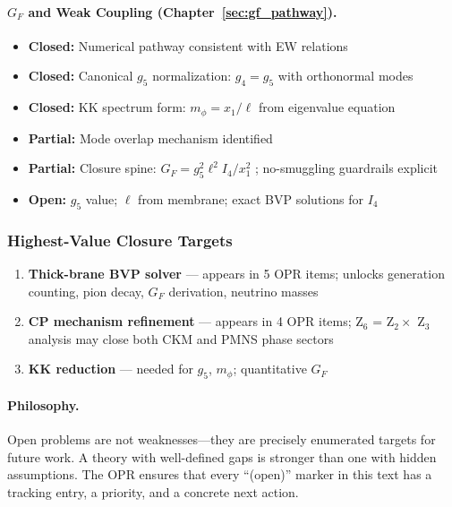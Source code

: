 \paragraph{\texorpdfstring{$G_F$ and Weak Coupling (Chapter~\ref{sec:gf_pathway}).}{GF and Weak Coupling.}}
\begin{itemize}[nosep]
    \item \textcolor{OliveGreen}{\textbf{Closed:}} Numerical pathway consistent with EW relations \tagDc{}
    \item \textcolor{OliveGreen}{\textbf{Closed:}} Canonical $g_5$ normalization: $g_4 = g_5$ with orthonormal modes \tagDc{}
    \item \textcolor{OliveGreen}{\textbf{Closed:}} KK spectrum form: $m_\phi = x_1/\ell$ from eigenvalue equation \tagDc{}
    \item \textcolor{YellowOrange}{\textbf{Partial:}} Mode overlap mechanism identified \tagP{}
    \item \textcolor{YellowOrange}{\textbf{Partial:}} Closure spine: $G_F = g_5^2 \ell^2 I_4 / x_1^2$ \tagDc{}; no-smuggling guardrails explicit
    \item \textcolor{BrickRed}{\textbf{Open:}} $g_5$ value; $\ell$ from membrane; exact BVP solutions for $I_4$
\end{itemize}

\subsubsection{Highest-Value Closure Targets}

\begin{enumerate}
    \item \textbf{Thick-brane BVP solver} --- appears in 5 OPR items; unlocks generation
          counting, pion decay, $G_F$ derivation, neutrino masses
    \item \textbf{CP mechanism refinement} --- appears in 4 OPR items; Z$_6$ = Z$_2 \times$ Z$_3$
          analysis may close both CKM and PMNS phase sectors
    \item \textbf{KK reduction} --- needed for $g_5$, $m_\phi$; quantitative $G_F$
\end{enumerate}

\paragraph{Philosophy.}
Open problems are not weaknesses---they are precisely enumerated targets for future
work. A theory with well-defined gaps is stronger than one with hidden assumptions.
The OPR ensures that every ``(open)'' marker in this text has a tracking entry,
a priority, and a concrete next action.


